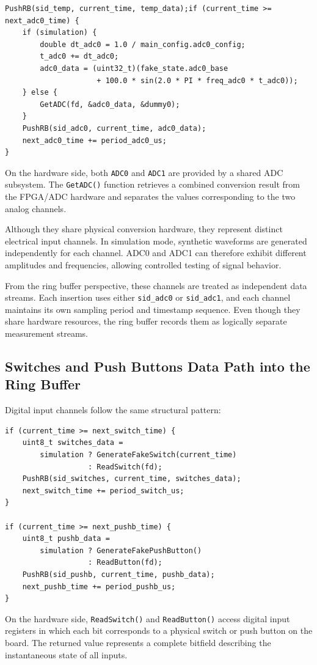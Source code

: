 \begin{verbatim}
PushRB(sid_temp, current_time, temp_data);if (current_time >= next_adc0_time) {
    if (simulation) {
        double dt_adc0 = 1.0 / main_config.adc0_config;
        t_adc0 += dt_adc0;
        adc0_data = (uint32_t)(fake_state.adc0_base
                     + 100.0 * sin(2.0 * PI * freq_adc0 * t_adc0));
    } else {
        GetADC(fd, &adc0_data, &dummy0);
    }
    PushRB(sid_adc0, current_time, adc0_data);
    next_adc0_time += period_adc0_us;
}
\end{verbatim}
On the hardware side, both \texttt{ADC0} and \texttt{ADC1} are provided by a shared ADC subsystem. The \texttt{GetADC()} function retrieves a combined conversion result from the FPGA/ADC hardware and separates the values corresponding to the two analog channels.

 Although they share physical conversion hardware, they represent distinct electrical input channels.
In simulation mode, synthetic waveforms are generated independently for each channel. ADC0 and ADC1 can therefore exhibit different amplitudes and frequencies, allowing controlled testing of signal behavior.

From the ring buffer perspective, these channels are treated as independent data streams. Each insertion uses either \texttt{sid\_adc0} or \texttt{sid\_adc1}, and each channel maintains its own sampling period and timestamp sequence. Even though they share hardware resources, the ring buffer records them as logically separate measurement streams.

\subsection{Switches and Push Buttons Data Path into the Ring Buffer}
Digital input channels follow the same structural pattern:

\begin{verbatim}
if (current_time >= next_switch_time) {
    uint8_t switches_data =
        simulation ? GenerateFakeSwitch(current_time)
                   : ReadSwitch(fd);
    PushRB(sid_switches, current_time, switches_data);
    next_switch_time += period_switch_us;
}

if (current_time >= next_pushb_time) {
    uint8_t pushb_data =
        simulation ? GenerateFakePushButton()
                   : ReadButton(fd);
    PushRB(sid_pushb, current_time, pushb_data);
    next_pushb_time += period_pushb_us;
}
\end{verbatim}
On the hardware side, \texttt{ReadSwitch()} and \texttt{ReadButton()} access digital input registers in which each bit corresponds to a physical switch or push button on the board. The returned value represents a complete bitfield describing the instantaneous state of all inputs.

